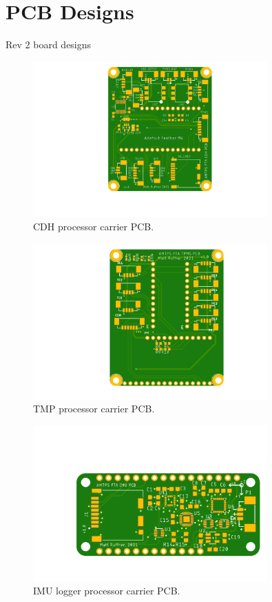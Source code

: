 \documentclass[UKenglish]{beamer}
\begin{document}
\section{PCB Designs}
\begin{frame}[allowframebreaks]{Rev 2 board designs}
	
	\begin{figure}[h!]
		\centering
		\includegraphics[width=0.8\textwidth]{images/main_board.png}
		\caption{CDH processor carrier PCB.}
	\end{figure}

	\begin{figure}[h!]
		\centering
		\includegraphics[width=0.8\textwidth]{images/tpms_breakout.png}
		\caption{TMP processor carrier PCB.}
	\end{figure}

	\begin{figure}[h!]
		\centering
		\includegraphics[width=0.8\textwidth]{images/imu_logger.png}
		\caption{IMU logger processor carrier PCB.}
	\end{figure}

\end{frame}
\end{document}
